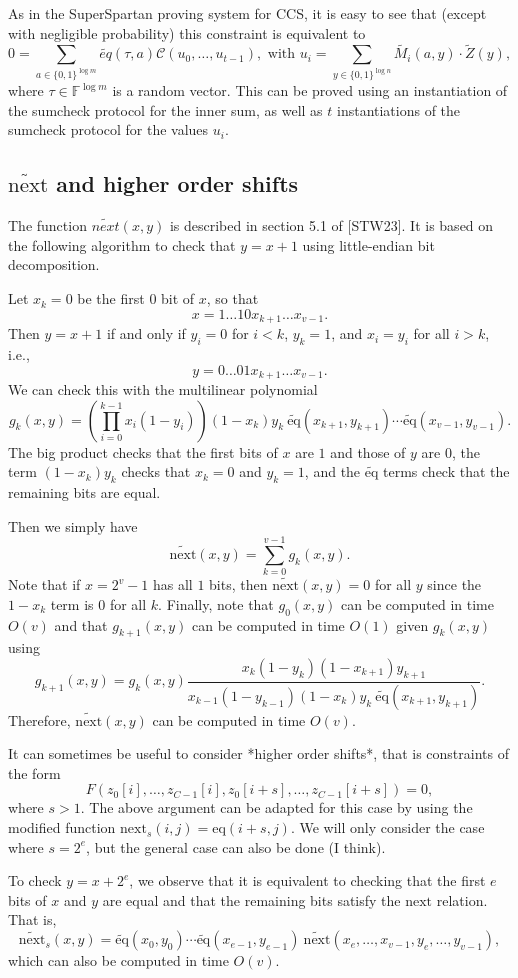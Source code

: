\documentclass[a4paper]{article}
\begin{document}
As in the SuperSpartan proving system for CCS, it is easy to see that (except with negligible probability) this constraint is equivalent to 
$$
0 = \sum_{a \in \{0,1\}^{\log m}} \widetilde{eq}(\tau,a) \mathcal{C}\left( u_0, \dots, u_{t-1}\right), \text{ with } u_i= \sum_{y \in \{0,1\}^{\log n}} \widetilde{M_i}(a,y)\cdot \widetilde{Z}(y),
$$
where $\tau\in \mathbb{F}^{\log m}$ is a random vector. This can be proved using an instantiation of the sumcheck protocol for the inner sum, as well as $t$ instantiations of the sumcheck protocol for the values $u_i$. 

\subsection*{$\widetilde{\text{next}}$ and higher order shifts}
The function $\widetilde{next}(x,y)$ is described in section 5.1 of [STW23]. It is based on the following algorithm to check that $y=x+1$ using little-endian bit decomposition.

Let $x_k=0$ be the first $0$ bit of $x$, so that $$x=1\dots 1 0 x_{k+1}\dots x_{v-1}.$$ Then $y=x+1$ if and only if $y_i=0$ for $i<k$, $y_k=1$, and $x_i=y_i$ for all $i>k$, i.e., $$y=0\dots 0 1 x_{k+1}\dots x_{v-1}.$$
We can check this with the multilinear polynomial
$$g_k(x,y) = \left(\prod_{i=0}^{k-1} x_i(1-y_i)\right)(1-x_k) y_k\ \widetilde{\text{eq}}(x_{k+1},y_{k+1})\cdots \widetilde{\text{eq}}(x_{v-1},y_{v-1}).$$
The big product checks that the first bits of $x$ are $1$ and those of $y$ are $0$, the term $(1-x_k)y_k$ checks that $x_k=0$ and $y_k=1$, and the $\widetilde{\text{eq}}$ terms check that the remaining bits are equal.

Then we simply have
$$ \widetilde{\text{next}}(x,y) = \sum_{k=0}^{v-1}g_k(x,y).$$
Note that if $x=2^v-1$ has all $1$ bits, then $\widetilde{\text{next}}(x,y)=0$ for all $y$ since the $1-x_k$ term is $0$ for all $k$. Finally, note that $g_0(x,y)$ can be computed in time $O(v)$ and that $g_{k+1}(x,y)$ can be computed in time $O(1)$ given $g_k(x,y)$ using 
$$ g_{k+1}(x,y) = g_k(x,y)\frac{x_k (1-y_k)(1-x_{k+1})y_{k+1}}{x_{k-1}(1-y_{k-1})(1-x_k)y_k\ \widetilde{\text{eq}}(x_{k+1},y_{k+1})}.$$
Therefore, $\widetilde{\text{next}}(x,y)$ can be computed in time $O(v)$.

$$ $$
It can sometimes be useful to consider *higher order shifts*, that is constraints of the form
$$
F(z_0[i],\dots,z_{C-1}[i],z_0[i+s],\dots,z_{C-1}[i+s])=0,
$$
where $s>1$. The above argument can be adapted for this case by using the modified function $\text{next}_s(i,j)=\text{eq}(i+s, j)$. We will only consider the case where $s=2^e$, but the general case can also be done (I think).

To check $y=x+2^e$, we observe that it is equivalent to checking that the first $e$ bits of $x$ and $y$ are equal and that the remaining bits satisfy the $\text{next}$ relation. That is,
$$\widetilde{\text{next}}_s(x,y)=\widetilde{\text{eq}}(x_{0},y_{0})\cdots \widetilde{\text{eq}}(x_{e-1},y_{e-1})\ \widetilde{\text{next}}(x_e,\dots,x_{v-1},y_e,\dots,y_{v-1}),$$
which can also be computed in time $O(v)$.





\end{document}
